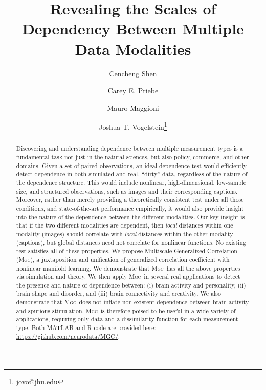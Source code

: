 \documentclass[11pt]{article}
\providecommand{\sct}[1]{{\normalfont\textsc{#1}}}
\newcommand{\Mgc}{\sct{Mgc}}
\newcommand{\website}{\url{https://github.com/neurodata/MGC/}}
\begin{document}
\def\spacingset#1{\renewcommand{\baselinestretch}%
{#1}\small\normalsize} \spacingset{1}

\title{\bf Revealing the Scales of Dependency Between Multiple Data Modalities}
\author[1,2]{Cencheng Shen} %
\author[1,3]{Carey E. Priebe}%
\author[3,4,6]{Mauro Maggioni}%
\author[1,5]{Joshua T. Vogelstein\thanks{jovo@jhu.edu}}
\maketitle

\begin{abstract}
Discovering and understanding dependence between multiple  measurement types is a fundamental task not just in the natural sciences, but also policy, commerce, and other domains.
Given a set of paired observations, an ideal dependence test would efficiently detect dependence in both simulated and real, ``dirty'' data, regardless of the nature of the dependence structure. This would include nonlinear,  high-dimensional, low-sample size, and structured observations, such as images and their corresponding captions.  Moreover, rather than merely providing a theoretically consistent test under all those conditions, and state-of-the-art performance empirically, it would also provide insight into the nature of the dependence between the different modalities.  
Our key insight is that if the two different modalities are dependent, then \emph{local} distances within one modality (images) should correlate with \emph{local} distances within the other modality (captions), but global distances need not correlate for  nonlinear functions.  
No existing test satisfies all of these properties.
We propose Multiscale Generalized Correlation (\Mgc), a juxtaposition and unification of  generalized correlation coefficient with nonlinear manifold learning.
We demonstrate that \Mgc~has all the above properties via simulation and theory.
We then apply \Mgc~in several real applications to detect the presence and nature  of dependence between: (i)  brain activity and personality, (ii) brain shape and disorder, and (iii) brain connectivity and creativity. We also demonstrate that \Mgc~does not inflate non-existent dependence between brain activity and spurious stimulation.  
\Mgc~is therefore poised to be useful in a wide variety of applications, requiring only data and a dissimilarity function for each measurement type.  Both MATLAB and R code are provided here: \website.
\end{abstract}
\end{document}
